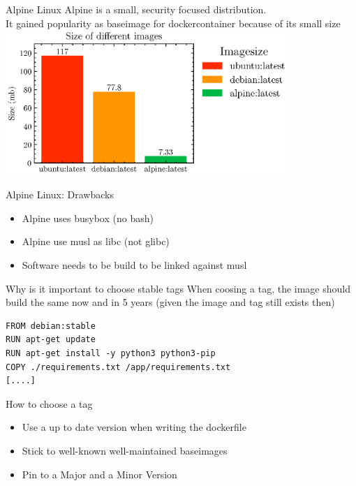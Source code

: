 \documentclass[12pt]{beamer}
\begin{document}
\begin{frame}{Alpine Linux}
    Alpine is a small, security focused distribution. \\
    It gained popularity as baseimage for dockercontainer because of its small size \\
    \includegraphics[width=0.8\textwidth]{scripts/image_sizes.eps}
\end{frame}
\begin{frame}{Alpine Linux: Drawbacks}

    \begin{itemize}[label=\textcolor{red}{\textbullet}]
        \item Alpine uses busybox (no bash)
        \item Alpine use musl as libc (not glibc)
        \item Software needs to be build to be linked against musl
    \end{itemize}
\end{frame}

\begin{frame}[fragile]{Why is it important to choose stable tags}
    When coosing a tag, the image should build the same now and in 5 years (given the image and tag still exists then)
    \begin{lstlisting}[language=docker]
FROM debian:stable
RUN apt-get update
RUN apt-get install -y python3 python3-pip
COPY ./requirements.txt /app/requirements.txt
[....]
    \end{lstlisting}
\end{frame}

\begin{frame}[fragile]{How to choose a tag}
    \begin{itemize}[label=\textcolor{green}{\textbullet}]
        \item Use a up to date version when writing the dockerfile
        \item Stick to well-known well-maintained baseimages
        \item Pin to a Major and a Minor Version
    \end{itemize}
\end{frame}
\end{document}
